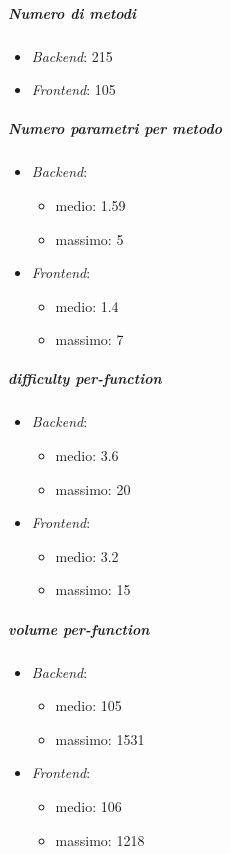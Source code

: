 	\subparagraph{Numero di metodi}
	\begin{itemize}
		\item \emph{Backend}: 215
		\item \emph{Frontend}: 105
	\end{itemize}
	 	

	\subparagraph{Numero parametri per metodo}
	\begin{itemize}
		\item \emph{Backend}: 
		\begin{itemize}
			\item medio: 1.59
			\item massimo: 5
		\end{itemize} 
		\item \emph{Frontend}: 
		\begin{itemize}
			\item medio: 1.4
			\item massimo: 7
		\end{itemize} 
	\end{itemize}


	\subparagraph{ difficulty per-function}
	\begin{itemize}
		\item \emph{Backend}: 
		\begin{itemize}
			\item medio: 3.6
			\item massimo: 20
		\end{itemize} 
		\item \emph{Frontend}: 
		\begin{itemize}
			\item medio: 3.2
			\item massimo: 15
		\end{itemize} 
	\end{itemize}

	
	\subparagraph{ volume per-function}
	\begin{itemize}
		\item \emph{Backend}: 
		\begin{itemize}
			\item medio: 105
			\item massimo: 1531
		\end{itemize} 
		\item \emph{Frontend}: 
		\begin{itemize}
			\item medio: 106
			\item massimo: 1218
		\end{itemize} 
	\end{itemize}


